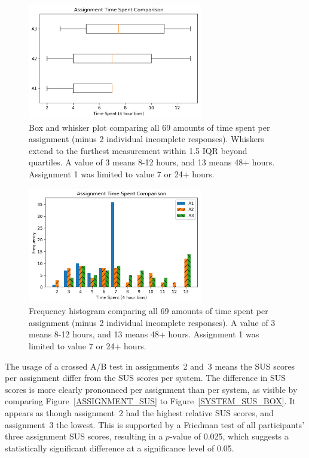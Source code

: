   \begin{figure}[ht]
    \centering
    \includegraphics[width=3in]{./figs/assignment-time-comparison-boxplot.png}
    \caption{Box and whisker plot comparing all 69 amounts of time spent per assignment (minus 2 individual incomplete responses). Whiskers extend to the furthest measurement within 1.5 IQR beyond quartiles. A value of 3 means 8-12 hours, and 13 means 48+ hours. Assignment 1 was limited to value 7 or 24+ hours.}
    \label{ASSIGNMENT_TIME_BOX}
  \end{figure}
  
  \begin{figure}[ht]
    \centering
    \includegraphics[width=3in]{./figs/assignment-time-comparison-histogram.png}
    \caption{Frequency histogram comparing all 69 amounts of time spent per assignment (minus 2 individual incomplete responses). A value of 3 means 8-12 hours, and 13 means 48+ hours. Assignment 1 was limited to value 7 or 24+ hours.}
    \label{ASSIGNMENT_TIME_HIST}
  \end{figure}

  The usage of a crossed A/B test in assignments~2 and~3 means the SUS scores per assignment differ from the SUS scores per system. The difference in SUS scores is more clearly pronounced per assignment than per system, as visible by comparing Figure~\ref{ASSIGNMENT_SUS} to Figure~\ref{SYSTEM_SUS_BOX}. It appears as though assignment~2 had the highest relative SUS scores, and assignment~3 the lowest. This is supported by a Friedman test of all participants' three assignment SUS scores, resulting in a $p$-value of 0.025, which suggests a statistically significant difference at a significance level of 0.05.
  
